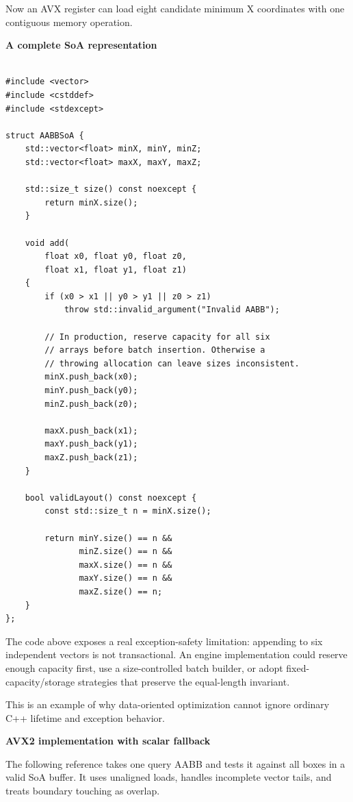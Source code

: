 Now an AVX register can load eight candidate minimum X coordinates with one contiguous memory operation.

\textbf{A complete SoA representation}

\begin{verbatim}

#include <vector>
#include <cstddef>
#include <stdexcept>

struct AABBSoA {
    std::vector<float> minX, minY, minZ;
    std::vector<float> maxX, maxY, maxZ;

    std::size_t size() const noexcept {
        return minX.size();
    }

    void add(
        float x0, float y0, float z0,
        float x1, float y1, float z1)
    {
        if (x0 > x1 || y0 > y1 || z0 > z1)
            throw std::invalid_argument("Invalid AABB");

        // In production, reserve capacity for all six
        // arrays before batch insertion. Otherwise a
        // throwing allocation can leave sizes inconsistent.
        minX.push_back(x0);
        minY.push_back(y0);
        minZ.push_back(z0);

        maxX.push_back(x1);
        maxY.push_back(y1);
        maxZ.push_back(z1);
    }

    bool validLayout() const noexcept {
        const std::size_t n = minX.size();

        return minY.size() == n &&
               minZ.size() == n &&
               maxX.size() == n &&
               maxY.size() == n &&
               maxZ.size() == n;
    }
};
\end{verbatim}

The code above exposes a real exception-safety limitation: appending to six independent vectors is not transactional. An engine implementation could reserve enough capacity first, use a size-controlled batch builder, or adopt fixed-capacity/storage strategies that preserve the equal-length invariant.

This is an example of why data-oriented optimization cannot ignore ordinary C++ lifetime and exception behavior.

\textbf{AVX2 implementation with scalar fallback}

The following reference takes one query AABB and tests it against all boxes in a valid SoA buffer. It uses unaligned loads, handles incomplete vector tails, and treats boundary touching as overlap.

